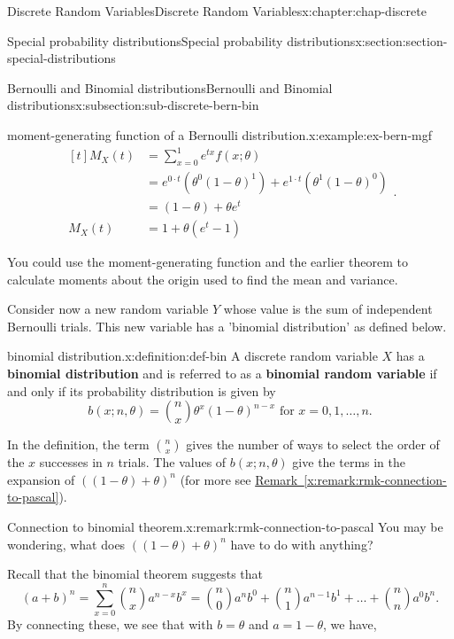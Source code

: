 \documentclass[oneside,10pt,]{book}
\newcommand{\xreffont}{\relax}
\newcommand{\terminology}[1]{\textbf{#1}}
\numberwithin{equation}{section}
\newcommand{\amp}{&}
\begin{document}
\begin{chapterptx}{Discrete Random Variables}{}{Discrete Random Variables}{}{}{x:chapter:chap-discrete}
\begin{sectionptx}{Special probability distributions}{}{Special probability distributions}{}{}{x:section:section-special-distributions}
\begin{subsectionptx}{Bernoulli and Binomial distributions}{}{Bernoulli and Binomial distributions}{}{}{x:subsection:sub-discrete-bern-bin}
\begin{example}{moment-generating function of a Bernoulli distribution.}{x:example:ex-bern-mgf}
\begin{equation*}
\begin{aligned}[t]
M_X(t) \amp = \sum_{x=0}^1 e^{tx} f(x; \theta)\\
\amp = e^{0\cdot t}\left(\theta^0(1-\theta)^1\right) + e^{1\cdot
t}\left(\theta^1(1-\theta)^0\right)\\
\amp = (1-\theta) + \theta e^t\\
M_X(t) \amp = 1 + \theta (e^t-1)
\end{aligned}\text{.}
\end{equation*}
%
\end{example}
You could use the moment-generating function and the earlier theorem to calculate moments about the origin used to find the mean and variance.%
\par
Consider now a new random variable \(Y\) whose value is the sum of independent Bernoulli trials. This new variable has a 'binomial distribution' as defined below.%
\begin{definition}{binomial distribution.}{x:definition:def-bin}%
A discrete random variable \(\displaystyle X\) has a \terminology{binomial distribution} and is referred to as a \terminology{binomial random variable} if and only if its probability distribution is given by%
\begin{equation*}
b(x; n, \theta) = {n\choose
x}\theta^x(1-\theta)^{n-x} \text{ for }x = 0, 1, \dots, n\text{.}
\end{equation*}
%
\end{definition}
In the definition, the term \(\displaystyle {n \choose x}\) gives the number of ways to select the order of the \(x\) successes in \(n\) trials. The values of \(b(x; n, \theta)\) give the terms in the expansion of \(\displaystyle
\left((1-\theta) + \theta\right)^n\) (for more see \hyperref[x:remark:rmk-connection-to-pascal]{Remark~{\xreffont\ref{x:remark:rmk-connection-to-pascal}}}).%
\begin{remark}{Connection to binomial theorem.}{x:remark:rmk-connection-to-pascal}%
You may be wondering, what does \(\displaystyle
\left((1-\theta) + \theta\right)^n\) have to do with anything?%
\par
Recall that the binomial theorem suggests that%
\begin{equation*}
(a+b)^{n} = \sum\limits_{x=0}^n {n \choose x}a^{n-x}b^x = {n \choose 0} a^{n}b^{0} + {n \choose 1} a^{n-1}b^{1} + \dots + {n \choose n} a^{0}b^{n}.
\end{equation*}
By connecting these, we see that with \(b = \theta\) and \(a = 1-\theta\), we have,%
\begin{align*}

\end{align*}
\end{remark}
\end{subsectionptx}
\end{sectionptx}
\end{chapterptx}
\end{document}

